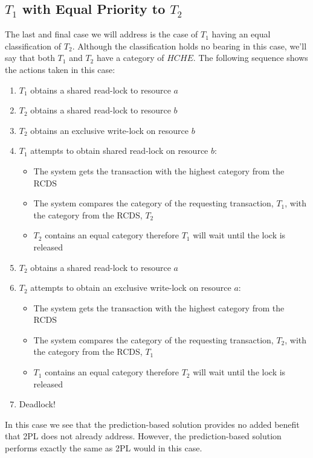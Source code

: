 \subsection{\texorpdfstring{$T_{1}$ with Equal Priority to $T_{2}$}{}}
\label{sec:t1_equal_to_t2}
The last and final case we will address is the case of $T_{1}$ having an equal classification of $T_{2}$. Although the classification holds no bearing in this case, we'll say that both $T_{1}$ and $T_{2}$ have a category of $HCHE$. The following sequence shows the actions taken in this case:

\begin{enumerate}
  \item $T_{1}$ obtains a shared read-lock to resource $a$
  \item $T_{2}$ obtains a shared read-lock to resource $b$
  \item $T_{2}$ obtains an exclusive write-lock on resource $b$
  \item $T_{1}$ attempts to obtain shared read-lock on resource $b$:
    \begin{itemize}
        \item The system gets the transaction with the highest category from the RCDS
        \item The system compares the category of the requesting transaction, $T_{1}$, with the category from the RCDS, $T_{2}$
        \item $T_{2}$ contains an equal category therefore $T_{1}$ will wait until the lock is released
    \end{itemize}
  \item $T_{2}$ obtains a shared read-lock to resource $a$
  \item $T_{2}$ attempts to obtain an exclusive write-lock on resource $a$:
    \begin{itemize}
        \item The system gets the transaction with the highest category from the RCDS
        \item The system compares the category of the requesting transaction, $T_{2}$, with the category from the RCDS, $T_{1}$
        \item $T_{1}$ contains an equal category therefore $T_{2}$ will wait until the lock is released
    \end{itemize}    
  \item Deadlock!
\end{enumerate}

In this case we see that the prediction-based solution provides no added benefit that 2PL does not already address. However, the prediction-based solution performs exactly the same as 2PL would in this case.

%